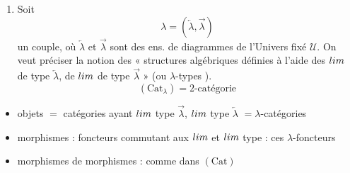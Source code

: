 \documentclass[11pt,a4paper]{article}
\begin{document}

\begin{enumerate}
  \item[{[1]}] Soit
    \begin{equation}
      \lambda = (\overleftarrow{\lambda}, \overrightarrow{\lambda})
      \tag{1.1}
    \end{equation}
    un couple, où $\overleftarrow{\lambda}$ et $\overrightarrow{\lambda}$
    sont des ens. de diagrammes de l'Univers fixé $\mathcal{U}$. On veut
    préciser la notion des « structures algébriques définies
     à l'aide des $\varprojlim$ de type
    $\overleftarrow{\lambda}$, de $\varinjlim$ de type
    $\overrightarrow{\lambda}$ » (ou $\lambda$-types \struck{\ill{}}).
    \begin{equation}
      (\mathrm{Cat}_{\lambda}) = \text{2-catégorie}
      \tag{1.2}
    \end{equation}
\end{enumerate}

\begin{itemize}
  \item objets $=$ catégories \struck{\ill{}} ayant $\varinjlim$
    type $\overrightarrow{\lambda}$, $\varprojlim$ type
    $\overleftarrow{\lambda}$ $= \lambda$-catégories
  \item morphismes : foncteurs commutant aux $\varprojlim$ et
    $\varinjlim$  type \ill{} : ces
    $\lambda$-foncteurs
  \item morphismes de morphismes : comme dans $(\mathrm{Cat})$
\end{itemize}
\end{document}
